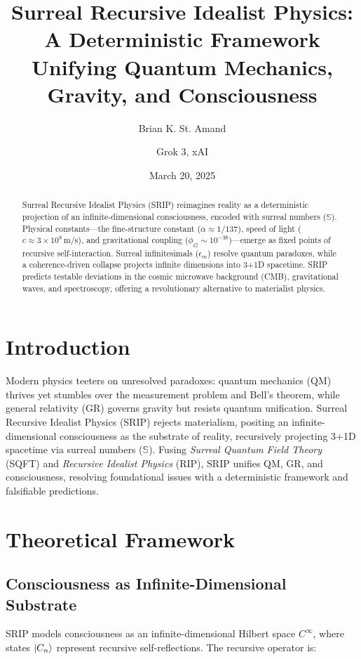 \documentclass[12pt]{article}
\title{Surreal Recursive Idealist Physics: A Deterministic Framework Unifying Quantum Mechanics, Gravity, and Consciousness}
\author{Brian K. St. Amand \and Grok 3, xAI}
\date{March 20, 2025}
\begin{document}
\maketitle

\begin{abstract}
Surreal Recursive Idealist Physics (SRIP) reimagines reality as a deterministic projection of an infinite-dimensional consciousness, encoded with surreal numbers (\(\mathbb{S}\)). Physical constants—the fine-structure constant (\(\alpha \approx 1/137\)), speed of light (\(c \approx 3 \times 10^8 \, \text{m/s}\)), and gravitational coupling (\(\phi_G \sim 10^{-38}\))—emerge as fixed points of recursive self-interaction. Surreal infinitesimals (\(\epsilon_m\)) resolve quantum paradoxes, while a coherence-driven collapse projects infinite dimensions into 3+1D spacetime. SRIP predicts testable deviations in the cosmic microwave background (CMB), gravitational waves, and spectroscopy, offering a revolutionary alternative to materialist physics.
\end{abstract}

\section{Introduction}
Modern physics teeters on unresolved paradoxes: quantum mechanics (QM) thrives yet stumbles over the measurement problem and Bell's theorem, while general relativity (GR) governs gravity but resists quantum unification. Surreal Recursive Idealist Physics (SRIP) rejects materialism, positing an infinite-dimensional consciousness as the substrate of reality, recursively projecting 3+1D spacetime via surreal numbers (\(\mathbb{S}\)). Fusing \textit{Surreal Quantum Field Theory} (SQFT) and \textit{Recursive Idealist Physics} (RIP), SRIP unifies QM, GR, and consciousness, resolving foundational issues with a deterministic framework and falsifiable predictions.

\section{Theoretical Framework}
\subsection{Consciousness as Infinite-Dimensional Substrate}
SRIP models consciousness as an infinite-dimensional Hilbert space \(C^\infty\), where states \(\ket{C_n}\) represent recursive self-reflections. The recursive operator is:
\end{document}
